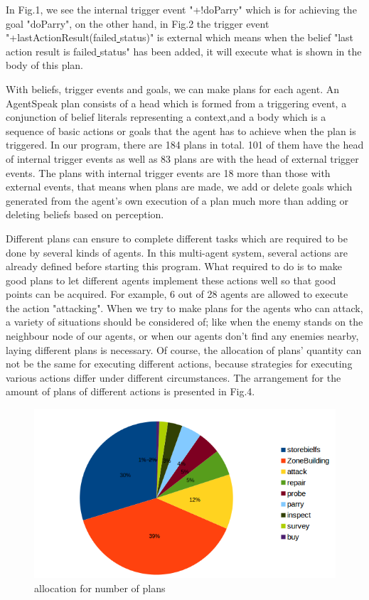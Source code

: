 In Fig.1, we see the internal trigger event "+!doParry" which is for achieving the goal "doParry", on the other hand, in Fig.2 the trigger event "+lastActionResult(failed\underline{ }status)" is external which means when the belief "last action result is failed\underline{ }status" has been added, it will execute what is shown in the body of this plan.

With beliefs, trigger events and goals, we can make plans for each agent. An AgentSpeak plan consists of a head which is formed from a triggering event, a conjunction of belief literals representing a context,and a body which is a sequence of basic actions or goals that the agent has to achieve when the plan is triggered\cite{rafael_BDIAgent_2005}. In our program, there are 184 plans in total. 101 of them have the head of internal trigger events as well as 83 plans are with the head of external trigger events. The plans with internal trigger events are 18 more than those with external events, that means when plans are made, we add or delete goals which generated from the agent’s own execution of a plan much more than adding or deleting beliefs based on perception. 

Different plans can ensure to complete different tasks which are required to be done by several kinds of agents. In this multi-agent system, several actions are already defined before starting this program. What required to do is to make good plans to let different agents implement these actions well so that good points can be acquired. For example, 6 out of 28 agents are allowed to execute the action "attacking". When we try to make plans for the agents who can attack, a variety of situations should be considered of; like when the enemy stands on the neighbour node of our agents, or when our agents don't find any enemies nearby, laying different plans is necessary. Of course, the allocation of plans' quantity can not be the same for executing different actions, because strategies for executing various actions differ under different circumstances. The arrangement for the amount of plans of different actions is presented in Fig.4.
\begin{figure}[H]
\centering
\begin{minipage}[!htbp]{\linewidth}
\includegraphics[width=5.0in]{images/BDI_plan_allocation}
\caption{allocation for number of plans}
\label{fig:plan_allocation}
\end{minipage}
\end{figure}

